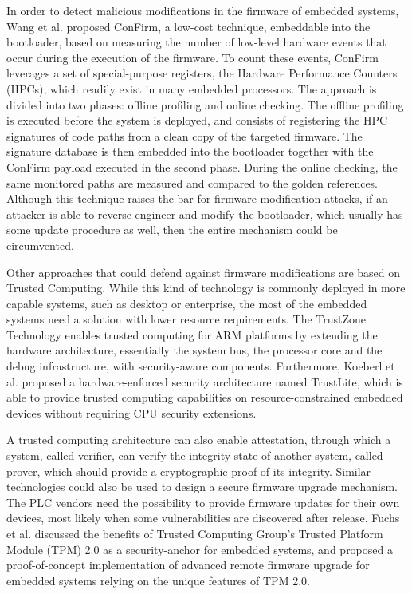 In order to detect malicious modifications in the firmware of embedded systems, Wang et al. \cite{confirm} proposed ConFirm,
a low-cost technique, embeddable into the bootloader, based on measuring the number of low-level hardware events that occur during the execution of the firmware.
To count these events, ConFirm leverages a set of special-purpose registers, the Hardware Performance Counters (HPCs), which readily exist in many embedded processors.
The approach is divided into two phases: offline profiling and online checking. The offline profiling is executed before the system is deployed,
and consists of registering the HPC signatures of code paths from a clean copy of the targeted firmware. The signature database is then embedded into the bootloader
together with the ConFirm payload executed in the second phase. During the online checking, the same monitored paths are measured and compared to the golden references.
Although this technique raises the bar for firmware modification attacks, if an attacker is able to reverse engineer and modify the bootloader,
which usually has some update procedure as well, then the entire mechanism could be circumvented.

Other approaches that could defend against firmware modifications are based on Trusted Computing. While this kind of technology is commonly deployed
in more capable systems, such as desktop or enterprise, the most of the embedded systems need a solution with lower resource requirements.
The TrustZone Technology \cite{trustzone} enables trusted computing for ARM platforms by extending the hardware architecture,
essentially the system bus, the processor core and the debug infrastructure, with security-aware components.
Furthermore, Koeberl et al. \cite{trustlite} proposed a hardware-enforced security architecture named TrustLite, which is able to provide trusted computing capabilities
on resource-constrained embedded devices without requiring CPU security extensions.

A trusted computing architecture can also enable attestation, through which a system, called verifier, can verify the integrity state of another system, called prover,
which should provide a cryptographic proof of its integrity. Similar technologies could also be used to design a secure firmware upgrade mechanism.
The PLC vendors need the possibility to provide firmware updates for their own devices, most likely when some vulnerabilities are discovered after release.
Fuchs et al. \cite{tpm2} discussed the benefits of Trusted Computing Group’s Trusted Platform Module (TPM) 2.0 as a security-anchor for embedded systems,
and proposed a proof-of-concept implementation of advanced remote firmware upgrade for embedded systems relying on the unique features of TPM 2.0.

